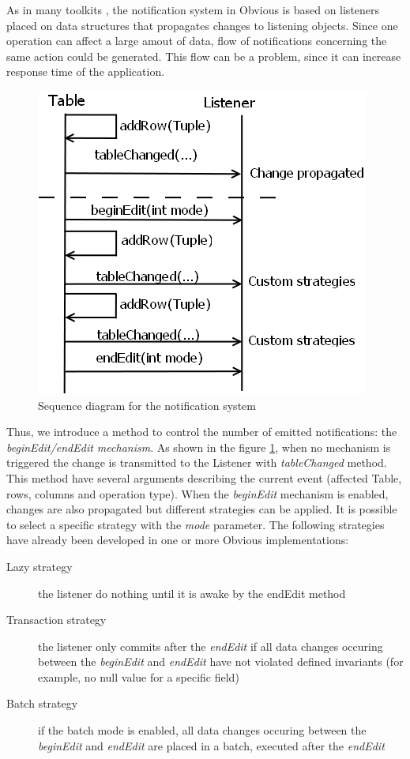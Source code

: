 As in many toolkits \cite{Prefuse,InfoVis,jung2003}, the notification system in Obvious is based on listeners placed on data structures that propagates changes to listening objects. Since one operation can affect a large amout of data, flow of notifications concerning the same action could be generated. This flow can be a problem, since it can increase response time of the application.

\begin{figure}[!ht]
\includegraphics[width=\columnwidth]{figures/notification}
\caption{Sequence diagram for the notification system}
\label{fig:notification}
\end{figure}

Thus, we introduce a method to control the number of emitted notifications: the \emph{beginEdit/endEdit mechanism}. As shown in the figure \ref{fig:notification}, when no mechanism is triggered the change is transmitted to the Listener with \emph{tableChanged} method. This method have several arguments describing the current event (affected Table, rows, columns and operation type). When the \emph{beginEdit} mechanism is enabled, changes are also propagated but different strategies can be applied. It is possible to select a specific strategy with the \emph{mode} parameter. The following strategies have already been developed  in one or more Obvious implementations:

\begin{description}
\item[Lazy strategy] the listener do nothing until it is awake by the endEdit method
\item[Transaction strategy] the listener only commits after the \emph{endEdit} if all data changes occuring between the \emph{beginEdit} and \emph{endEdit} have not violated defined invariants (for example, no null value for a specific field)
\item[Batch strategy] if the batch mode is enabled, all data changes occuring between the \emph{beginEdit} and \emph{endEdit} are placed in a batch, executed after the \emph{endEdit}
\end{description}

